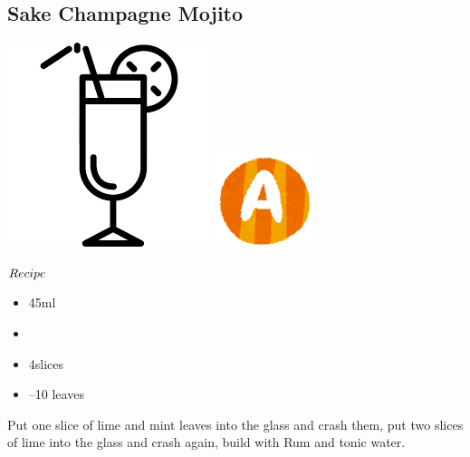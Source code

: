 \subsection{Sake Champagne Mojito}
\vspace{-7.5mm}
\hspace{65mm}
\includegraphics[scale=.07]{cocktail_glass_tall.png}
\includegraphics[scale=.12]{capital_a.png}
\vspace{2.5mm}
\begin{itembox}[l]{\boldmath $Recipe$}
\begin{itemize}
\setlength{\parskip}{0cm}
\setlength{\itemsep}{0cm}
\item \sake 45ml
\item \champagne
\item \lime 4slices
\item {}--10 leaves
\end{itemize}
\vspace{-4mm}
Put one slice of lime and mint leaves into the glass and crash them, put two slices of lime into the glass and crash again, build with Rum and tonic water.
\end{itembox}

